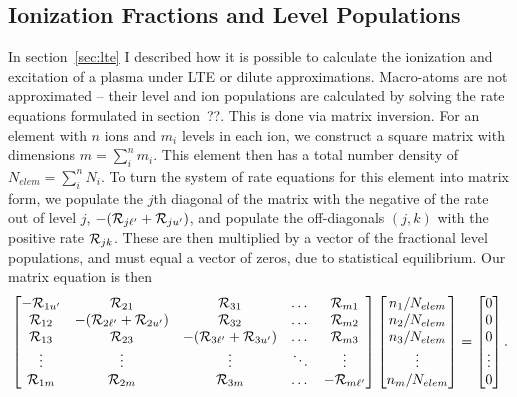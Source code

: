 



\subsection{Ionization Fractions and Level Populations}
\label{sec:matom_pops}
In section~\ref{sec:lte} I described how it is possible to calculate the
ionization and excitation of a plasma under LTE or dilute approximations.
Macro-atoms are not approximated -- their level and ion populations are 
calculated by solving the rate equations formulated in section~??. 
This is done via matrix inversion. For an element with $n$ ions and $m_i$
levels in each ion, we construct a square matrix with dimensions 
$m = \sum_i^n m_i$.
This element then has a total number density of $N_{elem} = \sum_i^n N_i$.
To turn the system of rate equations for this element into matrix form, we
populate the $j$th diagonal of the matrix with the negative of the rate out of
level $j$, $-({\cal R}_{j{\ell^\prime}} + {\cal R}_{j{u^\prime}})$, 
and populate the off-diagonals $(j,k)$ with the positive rate 
${\cal R}_{jk}$. These are then multiplied by a vector of the fractional level
populations, and must equal a vector of zeros, due to statistical equilibrium.
Our matrix equation is then
%
\begin{equation}
\begin{bmatrix}
    -{\cal R}_{1{u^\prime}} & {\cal R}_{21} & {\cal R}_{31} & \dots & {\cal R}_{m1} \\
    {\cal R}_{12} & -({\cal R}_{2{\ell^\prime}} + {\cal R}_{2{u^\prime}}) & {\cal R}_{32} & \dots & {\cal R}_{m2} \\
    {\cal R}_{13}  & {\cal R}_{23} & -({\cal R}_{3{\ell^\prime}} + {\cal R}_{3{u^\prime}}) & \dots & {\cal R}_{m3} \\
    \vdots & \vdots & \vdots & \ddots & \vdots \\
    {\cal R}_{1m}      & {\cal R}_{2m} & {\cal R}_{3m} & \dots & -{\cal R}_{m{\ell^\prime}}
\end{bmatrix}
\begin{bmatrix}
    n_1 / N_{elem} \\
    n_2 / N_{elem} \\
    n_3 / N_{elem} \\
    \vdots         \\
    n_m / N_{elem} 
\end{bmatrix}
=
\begin{bmatrix}
    0 \\
    0 \\
    0 \\
    \vdots \\
    0
\end{bmatrix}
.
\end{equation}
